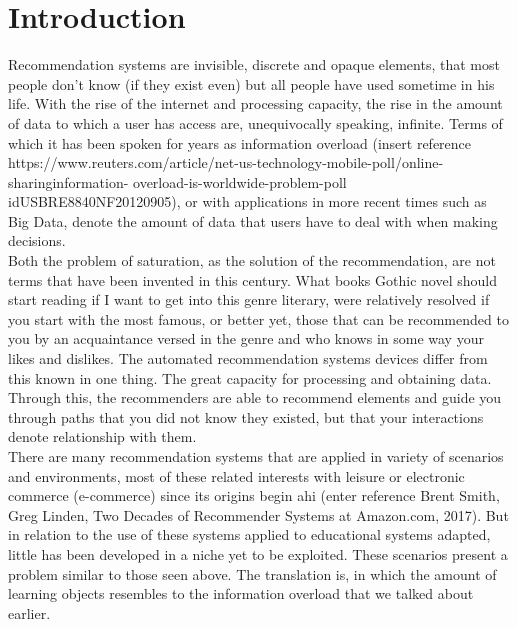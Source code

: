 \chapter{Introduction}
\label{cap:introduction}

Recommendation systems are invisible, discrete and opaque elements, that most people don't know (if they exist even) but all people have used sometime in his life. With the rise of the internet and processing capacity, the rise in the amount of data to which a user has access are, unequivocally speaking, infinite. Terms of which it has been spoken for years as information overload (insert reference https://www.reuters.com/article/net-us-technology-mobile-poll/online-sharinginformation- overload-is-worldwide-problem-poll idUSBRE8840NF20120905), or with applications in more recent times such as Big Data, denote the amount of data that users have to deal with when making decisions. \\

Both the problem of saturation, as the solution of the recommendation, are not terms that have been invented in this century. What books Gothic novel should start reading if I want to get into this genre literary, were relatively resolved if you start with the most famous, or better yet, those that can be recommended to you by an acquaintance versed in the genre and who knows in some way your likes and dislikes. The automated recommendation systems devices differ from this known in one thing. The great capacity for processing and obtaining data. Through this, the recommenders are able to recommend elements and guide you through paths that you did not know they existed, but that your interactions denote relationship with them. \\

There are many recommendation systems that are applied in variety of scenarios and environments, most of these related interests with leisure or electronic commerce (e-commerce) since its origins begin ahi (enter reference Brent Smith, Greg Linden, Two Decades of Recommender Systems at Amazon.com, 2017). But in relation to the use of these systems applied to educational systems adapted, little has been developed in a niche yet to be exploited. These scenarios present a problem similar to those seen above. The translation is, in which the amount of learning objects resembles to the information overload that we talked about earlier. \\ 

